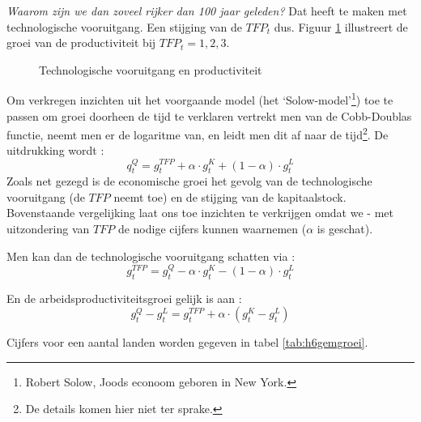 \textit{Waarom zijn we dan zoveel rijker dan 100 jaar geleden?} Dat heeft te maken met technologische vooruitgang. Een stijging van de $TFP_t$ dus. Figuur \ref{fig:h6tech} illustreert de groei van de productiviteit bij $TFP_t=1,2,3$.

\begin{figure}[H]
\vspace{0.5cm}
\centering\small
\captionsetup{justification=centering,margin=2cm}
\caption{Technologische vooruitgang en productiviteit}
\label{fig:h6tech}
\end{figure}

Om verkregen inzichten uit het voorgaande model (het `Solow-model'\footnote{Robert Solow, Joods econoom geboren in New York.}) toe te passen om groei doorheen de tijd te verklaren vertrekt men van de Cobb-Doublas functie, neemt men er de logaritme van, en leidt men dit af naar de tijd\footnote{De details komen hier niet ter sprake.}. De uitdrukking wordt :
$$q_t^Q=g_t^{TFP}+\alpha\cdot g_t^K+(1-\alpha)\cdot g_t^L$$
Zoals net gezegd is de economische groei het gevolg van de technologische vooruitgang (de $TFP$ neemt toe) en de stijging van de kapitaalstock. Bovenstaande vergelijking laat ons toe inzichten te verkrijgen omdat we - met uitzondering van $TFP$ de nodige cijfers kunnen waarnemen ($\alpha$ is geschat).
\par Men kan dan de technologische vooruitgang schatten via :
$$g_t^{TFP}=g_t^Q-\alpha\cdot g_t^K-(1-\alpha)\cdot g_t^L$$
\par En de arbeidsproductiviteitsgroei gelijk is aan :
$$g_t^Q-g_t^L=g_t^{TFP}+\alpha\cdot(g_t^K-g_t^L)$$

\par Cijfers voor een aantal landen worden gegeven in tabel \ref{tab:h6gemgroei}.

